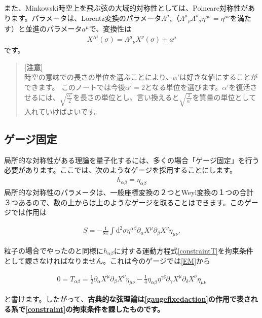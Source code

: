 \documentclass[report,paper=a4, fontsize=12pt, line_length=16cm, number_of_lines=34,dvipdfmx]{jlreq}
\newenvironment{important}{\begin{tcolorbox}[
  colback = white,
  colframe = red!35,
  boxrule = 2mm,
  fonttitle = \bfseries,
  after = \noindent] }{\end{tcolorbox}}
\numberwithin{equation}{chapter}
\numberwithin{equation}{section}
\newcommand{\del}{\partial}
\newcommand{\kyou}[1]{{\sffamily \bfseries #1}}
\newenvironment{remark}{\begin{quote}\small{\kyou{[注意]}}\\ }{\end{quote}}
\newcommand{\di}{\mathrm{d}}
\begin{document}
また、Minkowski時空上を飛ぶ弦の大域的対称性としては、Poincare対称性があります。パラメータは、Lorentz変換のパラメータ$\Lambda^{\mu}{}_{\nu}$（$\Lambda^{\mu}{}_{\rho}\Lambda^{\nu}{}_{\sigma}\eta^{\rho\sigma}=\eta^{\mu\nu}$を満たす）と並進のパラメータ$a^{\mu}$で、変換性は
\begin{align}
X'^{\mu}(\sigma)=\Lambda^{\mu}{}_{\nu}X^{\nu}(\sigma)+a^{\mu}
\end{align}
です。
\begin{remark}
時空の意味での長さの単位を選ぶことにより、$\alpha'$は好きな値にすることができます。
このノートでは今後$\alpha'=2$となる単位を選びます。$\alpha'$を復活させるには、$\sqrt{\frac{\alpha'}{2}}$を長さの単位とし、言い換えると$\sqrt{\frac{2}{\alpha'}}$を質量の単位として入れていけばよいです。
\end{remark}

\subsection{ゲージ固定}
局所的な対称性がある理論を量子化するには、多くの場合「ゲージ固定」を行う必要があります。ここでは、次のようなゲージを採用することにします。
\begin{align}
h_{\alpha\beta}=\eta_{\alpha\beta}
\end{align}
局所的な対称性のパラメータは、一般座標変換の２つとWeyl変換の１つの合計３つあるので、数の上からは上のようなゲージを取ることはできます。このゲージでは作用は
\begin{important}
  \begin{align}
    S=-\frac{1}{8\pi}\int \di^2\sigma \eta^{\alpha\beta}\del_{\alpha}X^{\mu}\del_{\beta}X^{\nu}\eta_{\mu\nu}.\label{gaugefixedaction}
    \end{align}      
\end{important}
粒子の場合でやったのと同様に$h_{\alpha\beta}$に対する運動方程式\eqref{constraintT}を拘束条件として課さなければなりません。これは今のゲージでは\eqref{EM}から
\begin{important}
  \begin{align}
    0=T_{\alpha\beta}=
    \frac12 \del_{\alpha}X^{\mu}\del_{\beta}X^{\nu}\eta_{\mu\nu}
    -\frac14 \eta_{\alpha\beta}\eta^{\gamma\delta}\del_{\gamma}X^{\mu}\del_{\delta}X^{\nu}\eta_{\mu\nu}\label{constraint}
    \end{align}      
\end{important}
と書けます。したがって、\kyou{古典的な弦理論は\eqref{gaugefixedaction}の作用で表される系で\eqref{constraint}の拘束条件を課したものです。}
\end{document}
